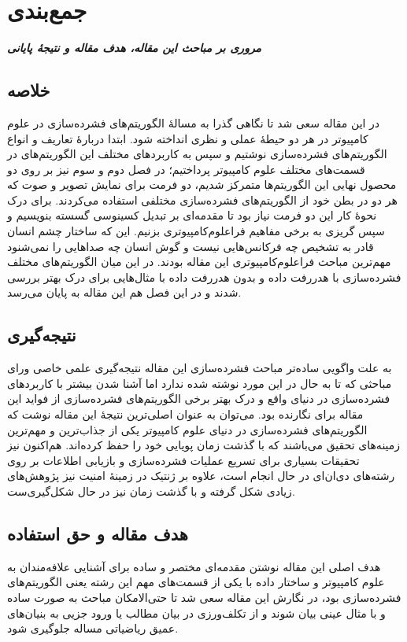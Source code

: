 \chapter{جمع‌بندی}
\noindent
\textbf{
	\textit{
      مروری بر مباحث این مقاله، هدف مقاله و نتیجهٔ پایانی
	}
}
\pagebreak

\section{خلاصه}
در این مقاله سعی شد تا نگاهی گذرا به مسالهٔ الگوریتم‌های فشرده‌سازی در علوم کامپیوتر در هر دو حیطهٔ عملی و نظری انداخته شود.
ابتدا دربارهٔ تعاریف و انواع الگوریتم‌های فشرده‌سازی نوشتیم و سپس به کاربردهای مختلف این الگوریتم‌های در قسمت‌های مختلف علوم کامپیوتر پرداختیم؛ 
در فصل دوم و سوم نیز بر روی دو محصول نهایی این الگوریتم‌ها متمرکز شدیم، دو فرمت برای نمایش تصویر و صوت که 
هر دو در بطن خود از الگوریتم‌های فشرده‌سازی مختلفی استفاده می‌کردند. 
برای درک نحوهٔ کار این دو فرمت نیاز بود تا مقدمه‌ای بر تبدیل کسینوسی گسسته بنویسیم و سپس گریزی به برخی مفاهیم فراعلوم‌کامپیوتری 
بزنیم. این که ساختار چشم انسان قادر به تشخیص چه فرکانس‌هایی نیست و گوش انسان چه صداهایی را نمی‌شنود مهم‌ترین مباحث فراعلوم‌کامپیوتری این 
مقاله بودند. در این میان الگوریتم‌های مختلف فشرده‌سازی با هدررفت داده و بدون هدررفت داده با مثال‌هایی برای درک بهتر
بررسی شدند و در این فصل هم این مقاله به پایان می‌رسد.

\section{نتیجه‌گیری}
به علت واگویی ساده‌تر مباحث فشرده‌سازی این مقاله نتیجه‌گیری علمی خاصی ورای مباحثی که تا به حال در این مورد نوشته شده ندارد اما 
آشنا شدن بیشتر با کاربردهای فشرده‌سازی در دنیای واقع و درک بهتر برخی الگوریتم‌های فشرده‌سازی از فواید این مقاله برای نگارنده بود. می‌توان به عنوان
اصلی‌ترین نتیجهٔ این مقاله نوشت که الگوریتم‌های فشرده‌سازی در دنیای علوم کامپیوتر یکی از جذاب‌ترین و مهم‌ترین زمینه‌های تحقیق
می‌باشند که با گذشت زمان پویایی خود را حفظ کرده‌اند. هم‌اکنون نیز تحقیقات بسیاری برای تسریع عملیات فشرده‌سازی و بازیابی اطلاعات بر روی رشته‌های دی‌ان‌ای 
در حال انجام است، علاوه بر ژنتیک در زمینهٔ امنیت نیز پژو‌هش‌های زیادی شکل گرفته و با گذشت زمان نیز در حال شکل‌گیری‌ست. 

\section{هدف مقاله و حق استفاده}
هدف اصلی این مقاله نوشتن مقدمه‌ای مختصر و ساده برای آشنایی علافه‌مندان به علوم کامپیوتر و ساختار داده با یکی از قسمت‌های مهم
این رشته یعنی الگوریتم‌های فشرده‌سازی بود، در نگارش این مقاله سعی شد تا حتی‌الامکان مباحث به صورت ساده و با مثال عینی بیان شوند و از 
تکلف‌ورزی در بیان مطالب یا ورود جزیی به بنیان‌های عمیق ریاضیاتی مساله جلوگیری شود. 

